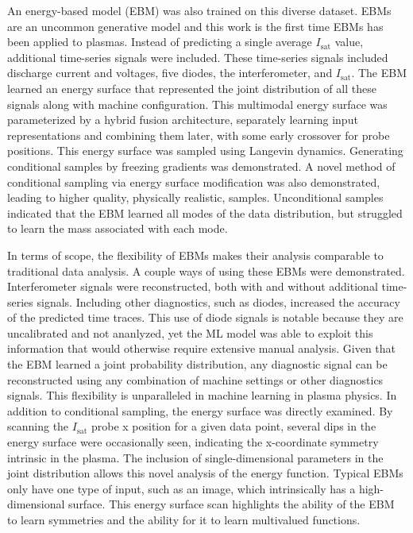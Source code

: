 An energy-based model (EBM) was also trained on this diverse dataset. EBMs are an uncommon generative model and this work is the first time EBMs has been applied to plasmas. Instead of predicting a single average $I_\text{sat}$ value, additional time-series signals were included. These time-series signals included discharge current and voltages, five diodes, the interferometer, and $I_\text{sat}$. The EBM learned an energy surface that represented the joint distribution of all these signals along with machine configuration. This multimodal energy surface was parameterized by a hybrid fusion architecture, separately learning input representations and combining them later, with some early crossover for probe positions. This energy surface was sampled using Langevin dynamics. Generating conditional samples by freezing gradients was demonstrated. A novel method of conditional sampling via energy surface modification was also demonstrated, leading to higher quality, physically realistic, samples. Unconditional samples indicated that the EBM learned all modes of the data distribution, but struggled to learn the mass associated with each mode.

In terms of scope, the flexibility of EBMs makes their analysis comparable to traditional data analysis. A couple ways of using these EBMs were demonstrated. Interferometer signals were reconstructed, both with and without additional time-series signals. Including other diagnostics, such as diodes, increased the accuracy of the predicted time traces. This use of diode signals is notable because they are uncalibrated and not ananlyzed, yet the ML model was able to exploit this information that would otherwise require extensive manual analysis. Given that the EBM learned a joint probability distribution, any diagnostic signal can be reconstructed using any combination of machine settings or other diagnostics signals. This flexibility is unparalleled in machine learning in plasma physics. In addition to conditional sampling, the energy surface was directly examined. By scanning the $I_\text{sat}$ probe x position for a given data point, several dips in the energy surface were occasionally seen, indicating the x-coordinate symmetry intrinsic in the plasma. The inclusion of single-dimensional parameters in the joint distribution allows this novel analysis of the energy function. Typical EBMs only have one type of input, such as an image, which intrinsically has a high-dimensional surface. This energy surface scan highlights the ability of the EBM to learn symmetries and the ability for it to learn multivalued functions.


